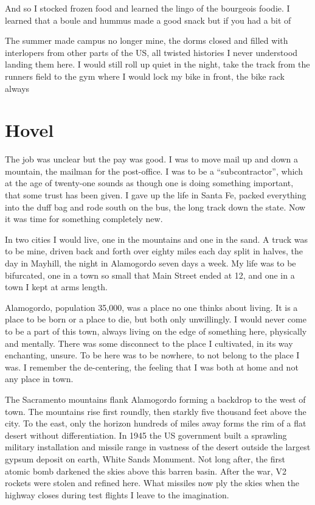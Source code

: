 \documentclass[ebook, 10pt, openright, onecolumn]{memoir}
\newlength{\drop}
\newcommand*\td[1]{
  \todo[inline]{
     #1 
  }
}
\newcommand*\finish{\td{ ----- Finish this section -----}}
\begin{document}
\finish

And so I stocked frozen food and learned the lingo of the bourgeois foodie. I
learned that a boule and hummus made a good snack but if you had a bit of


The summer made campus no longer mine, the dorms closed and filled with
interlopers from other parts of the US, all twisted histories I never understood
landing them here.  I would still roll up quiet in the night, take the track
from the runners field to the gym where I would lock my bike in front, the bike
rack always

\chapter{Hovel}
\label{cha:hovel}

The job was unclear but the pay was good.  I was to move mail up and down a
mountain, the mailman for the post-office.  I was to be a ``subcontractor'', which
at the age of twenty-one sounds as though one is doing something important, that
some trust has been given.  I gave up the life in Santa Fe,  packed everything
into the duff bag and rode south on the bus, the long track down the state.  Now
it was time for something completely new.

In two cities I would live, one in the mountains and one in the sand.  A truck
was to be mine, driven back and forth over eighty miles each day split in
halves, the day in Mayhill, the night in Alamogordo seven days a week.  My life
was to be bifurcated, one in a town so small that Main Street ended at 12, and
one in a town I kept at arms length.

Alamogordo, population 35,000, was a place no one thinks about living.  It is a
place to be born or a place to die, but both only unwillingly.  I would never
come to be a part of this town, always living on the edge of something here,
physically and mentally.  There was some disconnect to the place I cultivated,
in its way enchanting, unsure.  To be here was to be nowhere, to not belong to
the place I was.  I remember the de-centering, the feeling that I was both at
home and not any place in town.

The Sacramento mountains flank Alamogordo forming a backdrop to the west of
town.  The mountains rise first roundly, then starkly five thousand feet above
the city.  To the east, only the horizon hundreds of miles away forms the rim of
a flat desert without differentiation.  In 1945 the US government built a
sprawling military installation and missile range in vastness of the desert
outside the largest gypsum deposit on earth, White Sands Monument.  Not long
after, the first atomic bomb darkened the skies above this barren basin.  After
the war, V2 rockets were stolen and refined here.  What missiles now ply the
skies when the highway closes during test flights I leave to the imagination.
\end{document}
